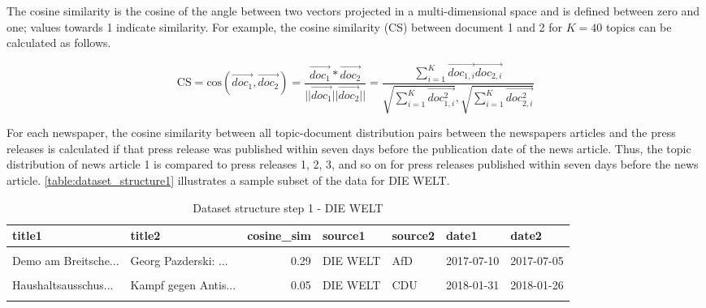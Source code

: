 \documentclass[
  12pt,
]{article}
\begin{document}
The cosine similarity is the cosine of the angle between two vectors
projected in a multi-dimensional space and is defined between zero and
one; values towards 1 indicate similarity. For example, the cosine
similarity (CS) between document 1 and 2 for \(K=40\) topics can be
calculated as follows.

\[
\text{CS} = \text{cos}(\vec{doc_1},\vec{doc_2})=\frac{\vec{doc_1}*\vec{doc_2}}{||\vec{doc_1}||\vec{doc_2}||}=\frac{\sum^K_{i=1} \vec{doc_{1,i}}\vec{doc_{2,i}}}{\sqrt{\sum^K_{i=1} \vec{doc^2_{1,i}}}, \sqrt{\sum^K_{i=1}\vec{doc^2_{2,i}}}}
\]

For each newspaper, the cosine similarity between all topic-document
distribution pairs between the newspapers articles and the press
releases is calculated if that press release was published within seven
days before the publication date of the news article. Thus, the topic
distribution of news article 1 is compared to press releases 1, 2, 3,
and so on for press releases published within seven days before the news
article. \autoref{table:dataset_structure1} illustrates a sample subset
of the data for DIE WELT.

\begin{table}[H]

\caption{\label{tab:Dataset structure 1}Dataset structure step 1 - DIE WELT \label{table:dataset_structure1}}
\centering
\fontsize{7}{9}\selectfont
\begin{tabular}[t]{llrllll}
\toprule
title1 & title2 & cosine\_sim & source1 & source2 & date1 & date2\\
\midrule
\cellcolor{gray!6}{SPD-General: "Ein...} & \cellcolor{gray!6}{Benötigen umfass...} & \cellcolor{gray!6}{0.13} & \cellcolor{gray!6}{DIE WELT} & \cellcolor{gray!6}{FDP} & \cellcolor{gray!6}{2018-02-11} & \cellcolor{gray!6}{2018-02-05}\\
Demo am Breitsche... & Georg Pazderski: ... & 0.29 & DIE WELT & AfD & 2017-07-10 & 2017-07-05\\
\cellcolor{gray!6}{Deutschlandtrend:...} & \cellcolor{gray!6}{Nährstoffbilanzie...} & \cellcolor{gray!6}{0.08} & \cellcolor{gray!6}{DIE WELT} & \cellcolor{gray!6}{SPD} & \cellcolor{gray!6}{2017-06-09} & \cellcolor{gray!6}{2017-06-09}\\
Haushaltsausschus... & Kampf gegen Antis... & 0.05 & DIE WELT & CDU & 2018-01-31 & 2018-01-26\\
\cellcolor{gray!6}{Grünen-Politiker ...} & \cellcolor{gray!6}{Personalmangel im...} & \cellcolor{gray!6}{0.17} & \cellcolor{gray!6}{DIE WELT} & \cellcolor{gray!6}{DIE LINKE} & \cellcolor{gray!6}{2017-09-14} & \cellcolor{gray!6}{2017-09-12}\\
\bottomrule
\end{tabular}
\end{table}
\end{document}
